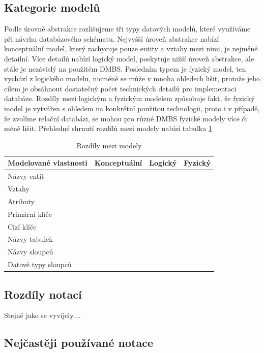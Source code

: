 \documentclass[czech,bachelor,public,dept460,male,oneside]{diploma}
\newcommand{\xmark}{\ding{55}}
\begin{document}
	\subsection{Kategorie modelů}
	Podle úrovně abstrakce rozlišujeme tři typy datových modelů, které využíváme při návrhu databázového schématu. Nejvyšší úroveň abstrakce nabízí konceptuální model, který zachycuje pouze entity a vztahy mezi nimi, je nejméně detailní. Více detailů nabízí logický model, poskytuje nižší úroveň abstrakce, ale stále je nezávislý na použitém DMBS. Posledním typem je fyzický model, ten vychází z logického modelu, nicméně se může v mnoha ohledech lišit, protože jeho cílem je obsáhnout dostatečný počet technických detailů pro implementaci databáze. Rozdíly mezi logickým a fyzickým modelem způsobuje fakt, že fyzický model je vytvářen s ohledem na konkrétní použitou technologii, proto i v případě, že zvolíme relační databázi, se mohou pro různé DMBS fyzické modely více či méně lišit. Přehledné shrnutí rozdílů mezi modely nabízí tabulka \ref{tab:modelTypes}
	
	\begin{table}[!h]
		\centering
		\caption{Rozdíly mezi modely}
		\label{tab:modelTypes}
		\begin{tabular}{l c c c}
			\toprule
			Modelované vlastnosti & Konceptuální & Logický & Fyzický \\
			\midrule
			Názvy entit & \checkmark& \checkmark & \xmark \\
			Vztahy & \checkmark& \checkmark & \xmark \\
			Atributy & \checkmark& \checkmark & \xmark \\
			Primární klíče & \xmark & \checkmark & \checkmark \\
			Cizí klíče & \xmark & \checkmark & \checkmark \\
			Názvy tabulek \\
			Názvy sloupců \\
			Datové typy sloupců \\
			\midrule
		\end{tabular}
		
	\end{table}
	
	\subsection{Rozdíly notací}
	Stejně jako se vyvíjely....
	
	\subsection{Nejčastěji používané notace} %
	
\end{document}
